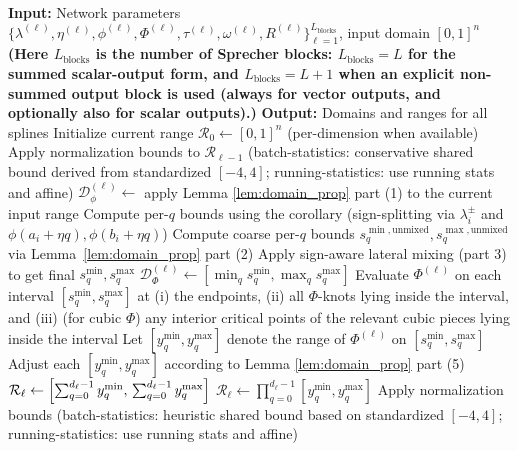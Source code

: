 \documentclass{article}
\theoremstyle{plain}
\theoremstyle{definition}
\theoremstyle{remark}
\begin{document}
\begin{algorithm}
\caption{Forward domain propagation with lateral mixing and per-dimension tracking}
\label{alg:domain_prop}
\begin{algorithmic}[1]
    \State \textbf{Input:} Network parameters $\{\lambda^{(\ell)}, \eta^{(\ell)}, \phi^{(\ell)}, \Phi^{(\ell)}, \tau^{(\ell)}, \omega^{(\ell)}, R^{(\ell)}\}_{\ell=1}^{L_{\text{blocks}}}$, input domain $[0,1]^n$
    \State \textbf{(Here $L_{\text{blocks}}$ is the number of Sprecher blocks: $L_{\text{blocks}}=L$ for the summed scalar-output form, and $L_{\text{blocks}}=L{+}1$ when an explicit non-summed output block is used (always for vector outputs, and optionally also for scalar outputs).)}
    \State \textbf{Output:} Domains and ranges for all splines
    \State Initialize current range $\mathcal{R}_0 \leftarrow [0,1]^n$ (per-dimension when available)
            \State Apply normalization bounds to $\mathcal{R}_{\ell-1}$ (batch-statistics: conservative shared bound derived from standardized $[-4,4]$; running-statistics: use running stats and affine)
        \EndIf
        \State $\mathcal{D}_\phi^{(\ell)} \leftarrow$ apply Lemma \ref{lem:domain_prop} part (1) to the current input range
            \State Compute per-$q$ bounds using the corollary (sign-splitting via $\lambda_i^\pm$ and $\phi(a_i+\eta q),\phi(b_i+\eta q)$)
        \Else
            \State Compute coarse per-$q$ bounds $s^{\min,\mathrm{unmixed}}_q,s^{\max,\mathrm{unmixed}}_q$ via Lemma~\ref{lem:domain_prop} part (2)
        \EndIf
        \State Apply sign-aware lateral mixing (part 3) to get final $s^{\min}_q, s^{\max}_q$
        \State $\mathcal{D}_\Phi^{(\ell)} \leftarrow [\min_q s^{\min}_q, \max_q s^{\max}_q]$
        \State Evaluate $\Phi^{(\ell)}$ on each interval $[s^{\min}_q, s^{\max}_q]$ at (i) the endpoints, (ii) all $\Phi$-knots lying inside the interval, and (iii) (for cubic $\Phi$) any interior critical points of the relevant cubic pieces lying inside the interval
        \State Let $[y_q^{\min},y_q^{\max}]$ denote the range of $\Phi^{(\ell)}$ on $[s_q^{\min},s_q^{\max}]$
            \State Adjust each $[y_q^{\min},y_q^{\max}]$ according to Lemma \ref{lem:domain_prop} part (5)
        \EndIf
            \State $\mathcal{R}_\ell \leftarrow \Bigl[\sum_{q=0}^{d_\ell-1} y_q^{\min},\,\sum_{q=0}^{d_\ell-1} y_q^{\max}\Bigr]$
        \Else
            \State $\mathcal{R}_\ell \leftarrow \prod_{q=0}^{d_\ell-1} [y_q^{\min},y_q^{\max}]$
        \EndIf
            \State Apply normalization bounds (batch-statistics: heuristic shared bound based on standardized $[-4,4]$; running-statistics: use running stats and affine)
        \EndIf
    \EndFor
\end{algorithmic}
\end{algorithm}
\end{document}
